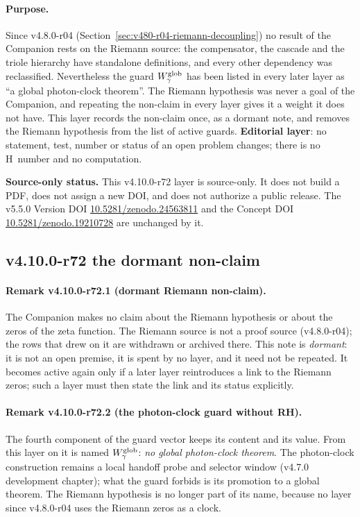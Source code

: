 \paragraph{Purpose.}
Since v4.8.0-r04 (Section~\ref{sec:v480-r04-riemann-decoupling}) no result of the Companion rests on the Riemann source:
the compensator, the cascade and the triole hierarchy have standalone definitions, and every other dependency was reclassified.
Nevertheless the guard \(W_\gamma^{\rm glob}\) has been listed in every later layer as ``a global photon-clock theorem''.
The Riemann hypothesis was never a goal of the Companion, and repeating the non-claim in every layer gives it a weight it does not have.
This layer records the non-claim once, as a dormant note, and removes the Riemann hypothesis from the list of active guards.
\textbf{Editorial layer}: no statement, test, number or status of an open problem changes; there is no H~number and no computation.

\noindent\textbf{Source-only status.}
This v4.10.0-r72 layer is source-only.  It does not build a PDF, does not assign a new DOI,
and does not authorize a public release.  The v5.5.0 Version DOI
\href{https://doi.org/10.5281/zenodo.24563811}{10.5281/zenodo.24563811} and the Concept DOI
\href{https://doi.org/10.5281/zenodo.19210728}{10.5281/zenodo.19210728} are unchanged by it.

\subsection*{v4.10.0-r72 the dormant non-claim}
\label{subsec:v4100-r72-non-claim}

\paragraph{Remark v4.10.0-r72.1 (dormant Riemann non-claim).}
The Companion makes no claim about the Riemann hypothesis or about the zeros of the zeta function.  The Riemann source
\cite{brendecke2026rh} is not a proof source (v4.8.0-r04); the rows that drew on it are withdrawn or archived there.
This note is \emph{dormant}: it is not an open premise, it is spent by no layer, and it need not be repeated.  It becomes active
again only if a later layer reintroduces a link to the Riemann zeros; such a layer must then state the link and its status explicitly.

\paragraph{Remark v4.10.0-r72.2 (the photon-clock guard without RH).}
The fourth component of the guard vector keeps its content and its value.  From this layer on it is named
\(W_\gamma^{\rm glob}\): \emph{no global photon-clock theorem}.  The photon-clock construction remains a local handoff probe and
selector window (v4.7.0 development chapter); what the guard forbids is its promotion to a global theorem.  The Riemann
hypothesis is no longer part of its name, because no layer since v4.8.0-r04 uses the Riemann zeros as a clock.

